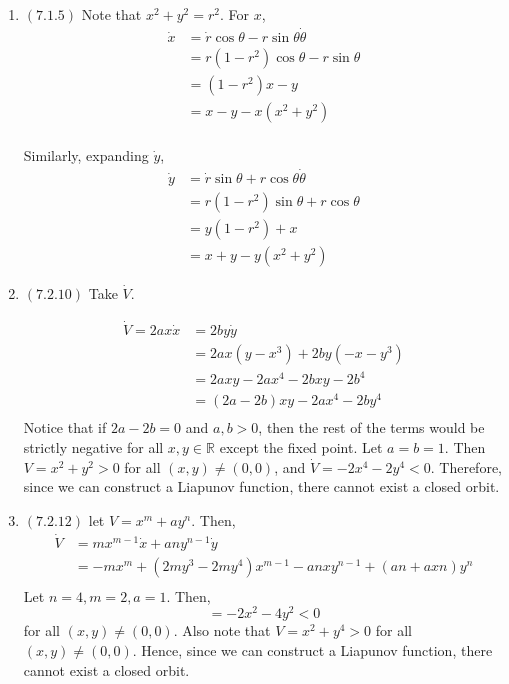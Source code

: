 \documentclass[12pt]{article}
\begin{document}

\begin{enumerate}[start=1,label={\bfseries Problem \arabic*:},leftmargin=1in] %
    \item $(7.1.5)$ Note that $x^2 + y^2 = r^2$. For $x$, \begin{align*}
        \dot{x} &= \dot{r}\cos\theta - r\sin\theta \dot{\theta}\\
            &= r(1-r^2)\cos\theta -r \sin \theta \\ 
            &= (1-r^2)x - y \\
            &= x - y - x(x^2 + y^2)\\ 
    \end{align*}
    
    Similarly, expanding $\dot{y}$, 
    \begin{align*}
        \dot{y} &= \dot{r} \sin\theta + r\cos \theta \dot{\theta} \\ 
        &= r(1-r^2)\sin\theta + r\cos\theta \\ 
        &= y(1-r^2) + x \\
        &= x + y - y(x^2 + y^2)
    \end{align*}

    \item $(7.2.10)$ Take $\dot{V}$. 
    
    \begin{align*}
        \dot{V} = 2ax\dot{x} &= 2by\dot{y} \\ 
        &= 2ax(y - x^3) + 2by(-x-y^3) \\ 
        &= 2axy - 2ax^4 - 2bxy - 2b^4 \\ 
        &= (2a - 2b)xy - 2ax^4 - 2by^4\\ 
     \end{align*}
     Notice that if $2a - 2b = 0$ and $a, b > 0$, then the rest of the terms would be strictly negative for all 
     $x, y \in \mathbb{R}$ except the fixed point. Let $a = b = 1$. Then $V = x^2 + y^2 > 0$ for all $(x, y) \neq (0, 0)$, and $\dot{V} = -2x^4 - 2y^4 < 0$.  
     Therefore, since we can construct a Liapunov function, there cannot exist a closed orbit.

     \item $(7.2.12)$ let $V = x^m + ay^n$. 
     Then, 
     \begin{align*}
        \dot{V} &= mx^{m-1}\dot{x} + any^{n-1}\dot{y}\\ 
        &= -mx^m + (2my^3 - 2my^4) x^{m-1} - anxy^{n-1} + (an + axn)y^n \\ 
     \end{align*}
     Let $n = 4, m = 2, a = 1$. Then, 
     \[
     = -2x^2 - 4y^2 < 0
     \]
     for all $(x, y) \neq (0, 0)$. Also note that $V = x^2 + y^4 > 0$ for all $(x ,y) \neq (0, 0)$. Hence, since we can construct a Liapunov function, there cannot exist a closed orbit.


\end{enumerate}
\end{document}
